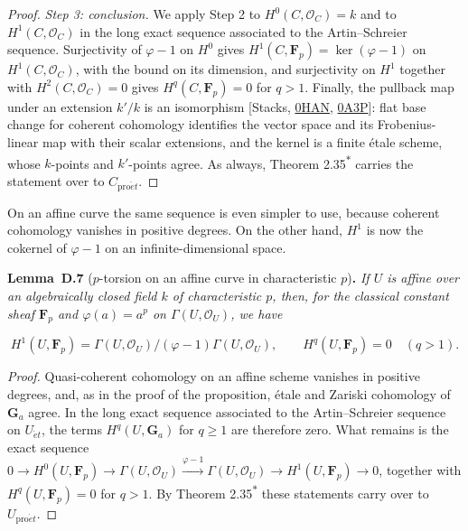 \documentclass[11pt]{article}
\newenvironment{bpstatement}[2]{\par\addvspace{0.6\baselineskip}\noindent\textbf{#1}#2\textbf{.}\enspace\ignorespaces}
  {\par\addvspace{0.4\baselineskip}}
\newenvironment{bpstatementit}[2]{\begin{bpstatement}{#1}{#2}\itshape\ignorespaces}{\end{bpstatement}}
\newcommand{\bpout}[1]{#1\textsuperscript{\hyperlink{bp-outside}{\ensuremath{\ast}}}}
\begin{document}
\begin{proof}[{Proof}]
\emph{Step 3: conclusion.} We apply Step 2 to \(H^0(C,\mathcal O_C)=k\) and to \(H^1(C,\mathcal O_C)\) in the long exact sequence associated to the Artin–Schreier sequence. Surjectivity of \(\varphi-1\) on \(H^0\) gives \(H^1(C,\mathbf F_p)=\ker(\varphi-1)\) on \(H^1(C,\mathcal O_C)\), with the bound on its dimension, and surjectivity on \(H^1\) together with \(H^2(C,\mathcal O_C)=0\) gives \(H^q(C,\mathbf F_p)=0\) for \(q>1\). Finally, the pullback map under an extension \(k'/k\) is an isomorphism [Stacks, \href{https://stacks.math.columbia.edu/tag/0HAN}{0HAN}, \href{https://stacks.math.columbia.edu/tag/0A3P}{0A3P}]: flat base change for coherent cohomology identifies the vector space and its Frobenius-linear map with their scalar extensions, and the kernel is a finite étale scheme, whose \(k\)-points and \(k'\)-points agree. As always, Theorem \bpout{2.35} carries the statement over to \(C_{\mathrm{pro}\acute{e}t}\).
\end{proof}

\label{bp22}%
On an affine curve the same sequence is even simpler to use, because coherent cohomology vanishes in positive degrees. On the other hand, \(H^1\) is now the cokernel of \(\varphi-1\) on an infinite-dimensional space.

\label{bp23}%
\begin{bpstatementit}{Lemma~D.7}{ ($p$-torsion on an affine curve in characteristic $p$)}
If \(U\) is affine over an algebraically closed field \(k\) of characteristic \(p\), then, for the classical constant sheaf \(\mathbf F_p\) and \(\varphi(a)=a^p\) on \(\Gamma(U,\mathcal O_U)\), we have

\[
H^1(U,\mathbf F_p)=
\Gamma(U,\mathcal O_U)/(\varphi-1)\Gamma(U,\mathcal O_U),\qquad
H^q(U,\mathbf F_p)=0\quad(q>1).
\]
\end{bpstatementit}

\begin{proof}[{Proof}]\label{bp24}%
Quasi-coherent cohomology on an affine scheme vanishes in positive degrees, and, as in the proof of the proposition, étale and Zariski cohomology of \(\mathbf G_a\) agree. In the long exact sequence associated to the Artin–Schreier sequence on \(U_{\acute{e}t}\), the terms \(H^q(U,\mathbf G_a)\) for \(q\geq1\) are therefore zero. What remains is the exact sequence \(0\to H^0(U,\mathbf F_p)\to\Gamma(U,\mathcal O_U)\xrightarrow{\varphi-1}\Gamma(U,\mathcal O_U)\to H^1(U,\mathbf F_p)\to0\), together with \(H^q(U,\mathbf F_p)=0\) for \(q>1\).  By Theorem \bpout{2.35} these statements carry over to \(U_{\mathrm{pro}\acute{e}t}\).
\end{proof}
\end{document}
